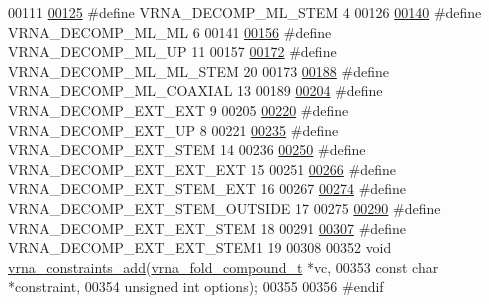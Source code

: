 \begin{DoxyCode}
00111 
\hypertarget{constraints_8h_source.tex_l00125}{}\hyperlink{group__constraints_ga4a23054c75d8efc785de50e3ea87602f}{00125} \textcolor{preprocessor}{#define VRNA\_DECOMP\_ML\_STEM     4}
00126 
\hypertarget{constraints_8h_source.tex_l00140}{}\hyperlink{group__constraints_ga7f4cb9ff7a33e67f0539bd39e7b19a78}{00140} \textcolor{preprocessor}{#define VRNA\_DECOMP\_ML\_ML       6}
00141 
\hypertarget{constraints_8h_source.tex_l00156}{}\hyperlink{group__constraints_gae6478dda14e50e2f2cb9ef333a29256e}{00156} \textcolor{preprocessor}{#define VRNA\_DECOMP\_ML\_UP       11}
00157 
\hypertarget{constraints_8h_source.tex_l00172}{}\hyperlink{group__constraints_ga63d8ceb8c96ae3b463e529e28cc0fe98}{00172} \textcolor{preprocessor}{#define VRNA\_DECOMP\_ML\_ML\_STEM 20}
00173 
\hypertarget{constraints_8h_source.tex_l00188}{}\hyperlink{group__constraints_ga4fe48d575830b16c208e280e01ab1497}{00188} \textcolor{preprocessor}{#define VRNA\_DECOMP\_ML\_COAXIAL  13}
00189 
\hypertarget{constraints_8h_source.tex_l00204}{}\hyperlink{group__constraints_ga437adf5115c1999304eff26b41e4c9b6}{00204} \textcolor{preprocessor}{#define VRNA\_DECOMP\_EXT\_EXT     9}
00205 
\hypertarget{constraints_8h_source.tex_l00220}{}\hyperlink{group__constraints_gaff1ddaffe86d984623910b40cc8a8717}{00220} \textcolor{preprocessor}{#define VRNA\_DECOMP\_EXT\_UP      8}
00221 
\hypertarget{constraints_8h_source.tex_l00235}{}\hyperlink{group__constraints_gae44b5ace0d9b4a29088069ecb4cec441}{00235} \textcolor{preprocessor}{#define VRNA\_DECOMP\_EXT\_STEM 14}
00236 
\hypertarget{constraints_8h_source.tex_l00250}{}\hyperlink{group__constraints_ga803bd818b3f4b2b0a4a5cfa2f7dc2045}{00250} \textcolor{preprocessor}{#define VRNA\_DECOMP\_EXT\_EXT\_EXT 15}
00251 
\hypertarget{constraints_8h_source.tex_l00266}{}\hyperlink{group__constraints_gabb09c5b78b75a44502fc77b950125c1e}{00266} \textcolor{preprocessor}{#define VRNA\_DECOMP\_EXT\_STEM\_EXT 16}
00267 
\hypertarget{constraints_8h_source.tex_l00274}{}\hyperlink{group__constraints_gae7554cd3ff089360c02e4920229e221c}{00274} \textcolor{preprocessor}{#define VRNA\_DECOMP\_EXT\_STEM\_OUTSIDE 17}
00275 
\hypertarget{constraints_8h_source.tex_l00290}{}\hyperlink{group__constraints_ga06efd054c9271438f6d82d4559d9e69f}{00290} \textcolor{preprocessor}{#define VRNA\_DECOMP\_EXT\_EXT\_STEM 18}
00291 
\hypertarget{constraints_8h_source.tex_l00307}{}\hyperlink{group__constraints_ga2e75d7a77118735b32f25422d9686719}{00307} \textcolor{preprocessor}{#define VRNA\_DECOMP\_EXT\_EXT\_STEM1 19}
00308 
00352 \textcolor{keywordtype}{void} \hyperlink{group__constraints_ga35a401f680969a556858a8dd5f1d07cc}{vrna\_constraints\_add}(\hyperlink{group__fold__compound_structvrna__fc__s}{vrna\_fold\_compound\_t} *vc,
00353                           \textcolor{keyword}{const} \textcolor{keywordtype}{char} *constraint,
00354                           \textcolor{keywordtype}{unsigned} \textcolor{keywordtype}{int} options);
00355 
00356 \textcolor{preprocessor}{#endif}
\end{DoxyCode}
